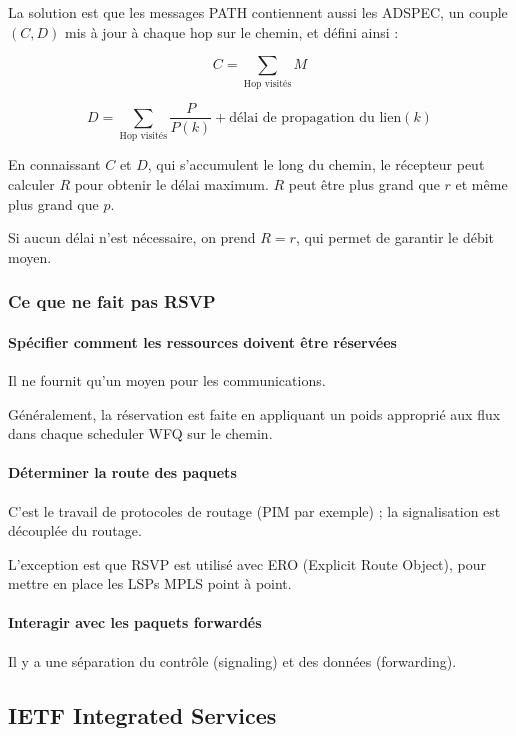 \documentclass[10pt,a4paper]{report}
\begin{document}
			La solution est que les messages PATH contiennent aussi les ADSPEC, un couple $(C, D)$ mis à jour à chaque hop sur le chemin, et défini ainsi :
			
			$$C = \sum_{\text{Hop visités}} M$$
			
			$$D = \sum_{\text{Hop visités}} \frac{P}{P(k)} + \text{délai de propagation du lien}(k)$$
			
			En connaissant $C$ et $D$, qui s'accumulent le long du chemin, le récepteur peut calculer $R$ pour obtenir le délai maximum. $R$ peut être plus grand que $r$ et même plus grand que $p$.
			
			Si aucun délai n'est nécessaire, on prend $R = r$, qui permet de garantir le débit moyen.
			
			\subsubsection{Ce que ne fait pas RSVP}
		
			\paragraph{Spécifier comment les ressources doivent être réservées} Il ne fournit qu'un moyen pour les communications.
			
			Généralement, la réservation est faite en appliquant un poids approprié aux flux dans chaque scheduler WFQ sur le chemin.
			
			\paragraph{Déterminer la route des paquets} C'est le travail de protocoles de routage (PIM par exemple) ; la signalisation est découplée du routage.
			
			L'exception est que RSVP est utilisé avec ERO (Explicit Route Object), pour mettre en place les LSPs MPLS point à point.
			
			\paragraph{Interagir avec les paquets forwardés} Il y a une séparation du contrôle (signaling) et des données (forwarding).
		
		\subsection{IETF Integrated Services}
			
\end{document}
